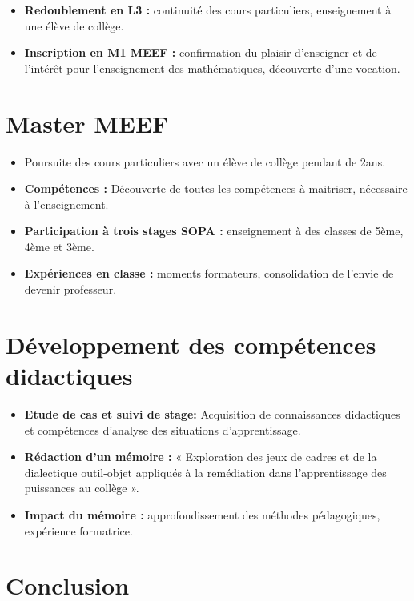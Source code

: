 \begin{itemize}
    \item \textbf{Redoublement en L3 :} continuité des cours particuliers,
    enseignement à une élève de collège.
    \item \textbf{Inscription en M1 MEEF :} confirmation du plaisir d'enseigner et de l'intérêt pour l'enseignement des mathématiques,
    découverte d'une vocation.
\end{itemize}


\section{Master MEEF}

\begin{itemize}
    \item Poursuite des cours particuliers avec un élève de collège pendant de 2ans.
    \item \textbf{Compétences :} Découverte de toutes les compétences à maitriser,
    nécessaire à l'enseignement.
    \item \textbf{Participation à trois stages SOPA :} enseignement à des classes de 5ème, 4ème et 3ème.
    \item \textbf{Expériences en classe :} moments formateurs,
    consolidation de l'envie de devenir professeur.
\end{itemize}

\section{Développement des compétences didactiques}

\begin{itemize}
    \item \textbf{Etude de cas et suivi de stage:} Acquisition de connaissances didactiques et compétences d'analyse des situations d'apprentissage.
    \item \textbf{Rédaction d'un mémoire :} « Exploration des jeux de cadres et de la dialectique outil-objet appliqués à la remédiation dans l'apprentissage des puissances au collège ».
    \item \textbf{Impact du mémoire :} approfondissement des méthodes pédagogiques, expérience formatrice.
\end{itemize}

\section*{Conclusion}

